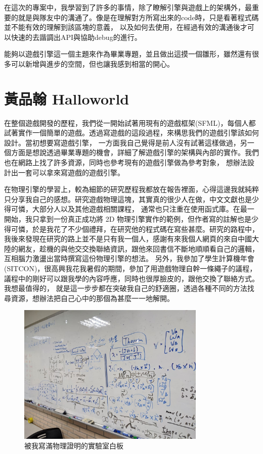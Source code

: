 在這次的專案中，我學習到了許多的事情，除了瞭解引擎與遊戲上的架構外，最重要的就是與隊友中的溝通了。像是在理解對方所寫出來的code時，只是看著程式碼並不能有效的理解到該區塊的意義，
以及如何去使用，在經過有效的溝通後才可以快速的去諧調出API與協助debug的進行。

能夠以遊戲引擎這一個主題來作為畢業專題，並且做出這摸一個雛形，雖然還有很多可以新增與進步的空間，但也讓我感到相當的開心。

\section{黃品翰 Halloworld}
\label{sec:Halloworld}

在整個遊戲開發的歷程，我們從一開始試著用現有的遊戲框架(SFML)，每個人都試著實作一個簡單的遊戲。透過寫遊戲的這段過程，來構思我們的遊戲引擎該如何設計。當初想要寫遊戲引擎，
一方面我自己覺得是前人沒有試著這樣做過，另一個方面是想說透過畢業專題的機會，詳細了解遊戲引擎的架構與內部的實作。我們也在網路上找了許多資源，同時也參考現有的遊戲引擎做為參考對象，
想辦法設計出一套可以拿來寫遊戲的遊戲引擎。

在物理引擎的學習上，較為細節的研究歷程我都放在報告裡面，心得這邊我就純粹只分享我自己的感想。研究遊戲物理這塊，其實真的很少人在做，中文文獻也是少得可憐，大部分人以及其他遊戲相關課程，
通常也只注重在使用函式庫。在最一開始，我只拿到一份真正成功將 2D 物理引擎實作的範例，但作者寫的註解也是少得可憐，於是我花了不少個禮拜，在研究他的程式碼在寫些甚麼。研究的路程中，
我後來發現在研究的路上並不是只有我一個人，感謝有來我個人網頁的來自中國大陸的網友，趁機的與他交交換聯絡資訊，跟他來回書信不斷地順順看自己的邏輯，互相腦力激盪出當時撰寫這份物理引擎的想法。
另外，我參加了學生計算機年會(SITCON)，很高興我花我暑假的期間，參加了用遊戲物理自幹一條繩子的議程，議程中的剛好可以跟我學的內容呼應，同時也很厚臉皮的，跟他交換了聯絡方式。我想最值得的，
就是這一步步都在突破我自己的舒適圈，透過各種不同的方法找尋資源，想辦法把自己心中的那個為甚麼一一地解開。

\begin{figure}[h]
    \begin{center}
    \includegraphics[width=0.8\textwidth]{./resources/ch6/halloworld_1.jpg}
    \end{center}
\caption*{被我寫滿物理證明的實驗室白板}
\end{figure}

